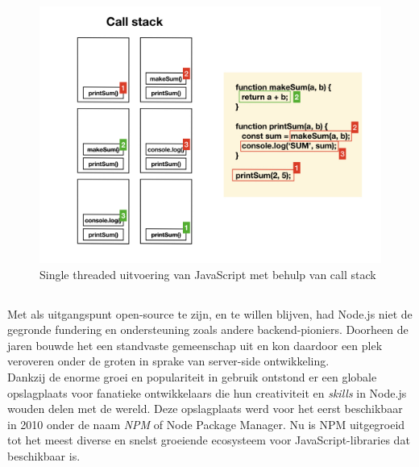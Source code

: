 \begin{figure}[H]
    \includegraphics[width=\linewidth]{img/SingleThreaded.jpeg}
    \caption[Single threaded JS met call stack]{Single threaded uitvoering van JavaScript met behulp van call stack}
    \label{fig:single-threaded}
\end{figure}

\subsection{}
\label{subsec:backend-javascript}

Met als uitgangspunt open-source te zijn, en te willen blijven, had Node.js niet de gegronde fundering en ondersteuning zoals andere backend-pioniers. Doorheen de jaren bouwde het een standvaste gemeenschap uit en kon daardoor een plek veroveren onder de groten in sprake van server-side ontwikkeling. \\
Dankzij de enorme groei en populariteit in gebruik ontstond er een globale opslagplaats voor fanatieke ontwikkelaars die hun creativiteit en \emph{skills} in Node.js wouden delen met de wereld. Deze opslagplaats werd voor het eerst beschikbaar in 2010 onder de naam \emph{NPM} of Node Package Manager. Nu is \gls{NPM} uitgegroeid tot het meest diverse en snelst groeiende ecosysteem voor JavaScript-libraries dat beschikbaar is.

